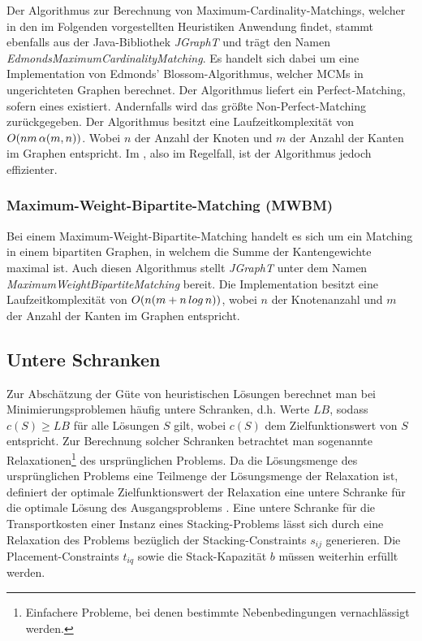 Der Algorithmus zur Berechnung von Maximum-Cardinality-Matchings, welcher in den im Folgenden
vorgestellten Heuristiken Anwendung findet, stammt ebenfalls aus der Java-Bibliothek \textit{JGraphT} \cite{JGraphT} und trägt
den Namen \textit{EdmondsMaximumCardinalityMatching}. Es handelt sich dabei um eine Implementation von Edmonds' Blossom-Algorithmus,
welcher MCMs in ungerichteten Graphen berechnet. Der Algorithmus liefert ein Perfect-Matching, sofern eines existiert.
Andernfalls wird das größte Non-Perfect-Matching zurückgegeben.
Der Algorithmus besitzt eine Laufzeitkomplexität von $O(nm \thinspace \alpha(m, n))$. Wobei $n$ der Anzahl der Knoten
und $m$ der Anzahl der Kanten im Graphen entspricht. Im , also im Regelfall, ist der Algorithmus jedoch effizienter.

\subsubsection{Maximum-Weight-Bipartite-Matching (MWBM)}
\label{sec:digression_mwbm}

Bei einem Maximum-Weight-Bipartite-Matching handelt es sich um ein Matching in einem bipartiten Graphen,
in welchem die Summe der Kantengewichte maximal ist. Auch diesen Algorithmus stellt \textit{JGraphT} \cite{JGraphT}
unter dem Namen \textit{MaximumWeightBipartiteMatching} bereit.
Die Implementation besitzt eine Laufzeitkomplexität von $O(n (m + n \thinspace log \thinspace n))$, wobei $n$ der Knotenanzahl
und $m$ der Anzahl der Kanten im Graphen entspricht.

\subsection{Untere Schranken}
\label{sec:lower_bounds}

Zur Abschätzung der Güte von heuristischen Lösungen berechnet man bei Minimierungsproblemen häufig untere Schranken,
d.h. Werte $LB$, sodass $c(S) \geq LB$ für alle Lösungen $S$ gilt, wobei $c(S)$ dem Zielfunktionswert von $S$ entspricht.
Zur Berechnung solcher Schranken betrachtet man sogenannte Relaxationen\footnote{Einfachere Probleme, bei denen bestimmte Nebenbedingungen vernachlässigt werden.} des ursprünglichen Problems.
Da die Lösungsmenge des ursprünglichen Problems eine Teilmenge der Lösungsmenge der Relaxation ist,
definiert der optimale Zielfunktionswert der Relaxation eine untere Schranke für die optimale Lösung des Ausgangsproblems
\cite{Knust2017}.\newline
Eine untere Schranke für die Transportkosten einer Instanz eines Stacking-Problems lässt sich
durch eine Relaxation des Problems bezüglich der Stacking-Constraints $s_{ij}$ generieren.
Die Placement-Constraints $t_{iq}$ sowie die Stack-Kapazität $b$ müssen weiterhin erfüllt werden.

